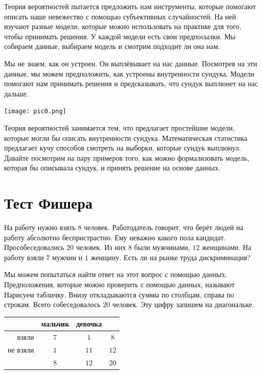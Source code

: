 \documentclass[12pt, a4paper, oneside]{article}
\begin{document}
Теория вероятностей пытается предложить нам инструменты, которые помогают описать наше невежество с помощью субъективных случайностей. На ней изучают разные модели, которые можно использовать на практике для того, чтобы принимать решения. У каждой модели есть свои предпосылки. Мы собираем данные, выбираем модель и смотрим подходит ли она нам. 

 Мы не знаем, как он устроен. Он выплёвывает на нас данные. Посмотрев на эти данные, мы можем предположить, как устроены внутренности сундука.  Модели помогают нам принимать решения и предсказывать, что сундук выплюнет на нас дальше.

\begin{center} 
\texttt{[image: pic0.png]}
\end{center} 

Теория вероятностей занимается тем, что предлагает простейшие модели, которые могли бы описать внутренности сундука. Математическая статистика предлагает кучу способов смотреть на выборки, которые сундук выплюнул. Давайте посмотрим на пару примеров того, как можно формализовать модель, которая бы описывала сундук, и принять решение на основе данных.

\section{Тест Фишера}

На работу нужно взять $8$ человек. Работодатель говорит, что берёт людей на работу абсолютно беспристрастно. Ему неважно какого пола кандидат. Прособеседовались $20$ человек. Из них $8$ были мужчинами, $12$ женщинами. На работу взяли $7$ мужчин и $1$ женщину. Есть ли на рынке труда дискриминация?  

Мы можем попытаться найти ответ на этот вопрос с помощью данных. Предположения, которые можно проверить с помощью данных, называют  Нарисуем табличку. Внизу откладываются суммы по столбцам, справа по строкам. Всего собеседовалось $20$ человек. Эту цифру запишем на диагональке. 

\begin{center}
    \begin{tabular}{|r|c|c|c|}
    \hline
                  & мальчик & девочка &        \\ \hline 
         взяли    &   $7$   &   $1$   & $8$    \\ \hline 
         не взяли &   $1$   &   $11$  & $12$   \\ \hline 
                  &   $8$   &   $12$  & $20$   \\ \hline
    \end{tabular}
\end{center}
\end{document}
